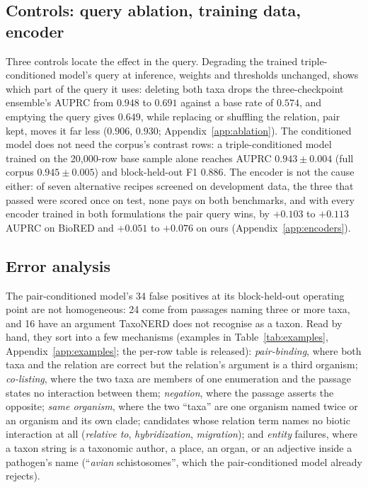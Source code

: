 \documentclass[11pt]{article}
\begin{document}
\subsection{Controls: query ablation, training data, encoder}
\label{sec:res-ablation}

Three controls locate the effect in the query. Degrading the trained triple-conditioned model's
query at inference, weights and thresholds unchanged, shows which part of the query it uses: deleting both taxa
drops the three-checkpoint ensemble's AUPRC from $0.948$ to $0.691$ against a base rate of $0.574$, and emptying the query gives
$0.649$, while replacing or shuffling the relation, pair kept, moves it far less ($0.906$, $0.930$;
Appendix~\ref{app:ablation}). The conditioned model does not need the corpus's contrast rows: a triple-conditioned
model trained on the 20{,}000-row base sample alone reaches AUPRC $0.943 \pm 0.004$ (full corpus
$0.945 \pm 0.005$) and block-held-out F1 $0.886$. The encoder is not the cause either: of seven alternative recipes
screened on development data, the three that passed were scored once on test, none pays on both
benchmarks, and with every encoder trained in both formulations the pair query wins, by $+0.103$ to $+0.113$ AUPRC on BioRED and
$+0.051$ to $+0.076$ on ours (Appendix~\ref{app:encoders}).

\subsection{Error analysis}
\label{sec:errors}
\label{sec:decomp}

The pair-conditioned model's 34 false positives at its block-held-out operating point are not
homogeneous: 24 come from passages naming three or more taxa, and 16 have an argument TaxoNERD does
not recognise as a taxon. Read by hand, they sort into a few mechanisms (examples in
Table~\ref{tab:examples}, Appendix~\ref{app:examples}; the per-row table is released):
\emph{pair-binding}, where both taxa and the relation are correct but the relation's argument is a
third organism; \emph{co-listing}, where the two taxa are members of one enumeration and the passage
states no interaction between them; \emph{negation}, where the passage asserts the
opposite; \emph{same organism}, where the two ``taxa'' are one organism named twice or an organism
and its own clade; candidates whose relation term names no biotic interaction at all
(\emph{relative to}, \emph{hybridization}, \emph{migration}); and \emph{entity} failures, where a
taxon string is a taxonomic author, a place, an organ, or an adjective inside a pathogen's name
(``\emph{avian} schistosomes'', which the pair-conditioned model already rejects).
\end{document}
